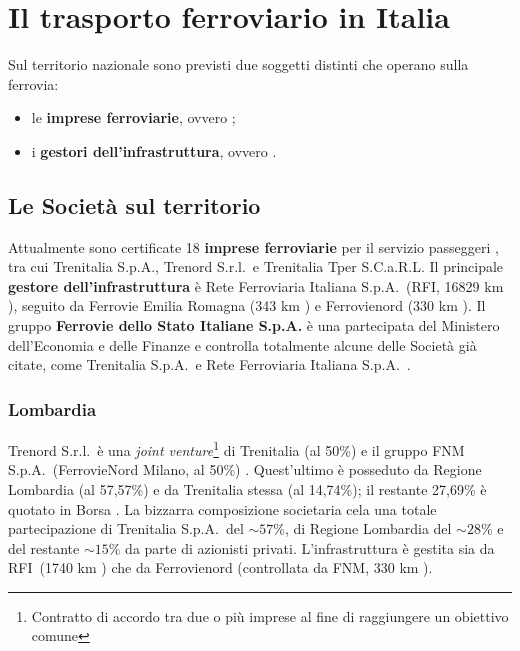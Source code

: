 \documentclass[12pt,a4paper,italian]{report}
\begin{document}
\section{Il trasporto ferroviario in Italia}

Sul territorio nazionale sono previsti due soggetti distinti che
operano sulla ferrovia:
\begin{itemize}
	\item le \textbf{imprese ferroviarie}, ovvero ;
	\item i \textbf{gestori dell'infrastruttura}, ovvero
    .
\end{itemize}

\subsection{Le Società sul territorio}
\label{societa_territorio}

Attualmente sono certificate 18 \textbf{imprese ferroviarie} per il
servizio passeggeri \cite{ElencoIF}, tra cui Trenitalia S.p.A.,
Trenord S.r.l.\ e Trenitalia Tper S.C.a.R.L.  Il principale
\textbf{gestore dell'infrastruttura} è Rete Ferroviaria Italiana
S.p.A.\ (RFI, 16829 km \cite{RfiKm}), seguito da Ferrovie Emilia
Romagna (343 km \cite{FerKm}) e Ferrovienord (330 km
\cite{FerNordKm}).  Il gruppo \textbf{Ferrovie dello Stato Italiane
    S.p.A.} è una partecipata del Ministero dell'Economia e delle
Finanze \cite{MefGruppoFS} e controlla totalmente alcune delle Società
già citate, come Trenitalia S.p.A.\ e Rete Ferroviaria Italiana
S.p.A.\ \cite{ControllateFS}.

\subsubsection{Lombardia}

Trenord S.r.l.\ è una \textit{joint venture}\footnote{Contratto di
    accordo tra due o più imprese al fine di raggiungere un obiettivo
    comune} di Trenitalia (al 50\%) e il gruppo FNM S.p.A.\
(FerrovieNord Milano, al 50\%) \cite{TrenordChiSiamo}.  Quest'ultimo è
posseduto da Regione Lombardia (al 57,57\%) e da Trenitalia stessa (al
14,74\%); il restante 27,69\% è quotato in Borsa
\cite{BorsaItalianaFNM}.  La bizzarra composizione societaria cela una
totale partecipazione di Trenitalia S.p.A.\ del $\sim 57\%$, di
Regione Lombardia del $\sim 28$\% e del restante $\sim 15\%$ da parte
di azionisti privati.  L'infrastruttura è gestita sia da RFI\ (1740 km
\cite{RfiKm}) che da Ferrovienord (controllata da FNM, 330 km
\cite{FerNordKm}).
\end{document}
